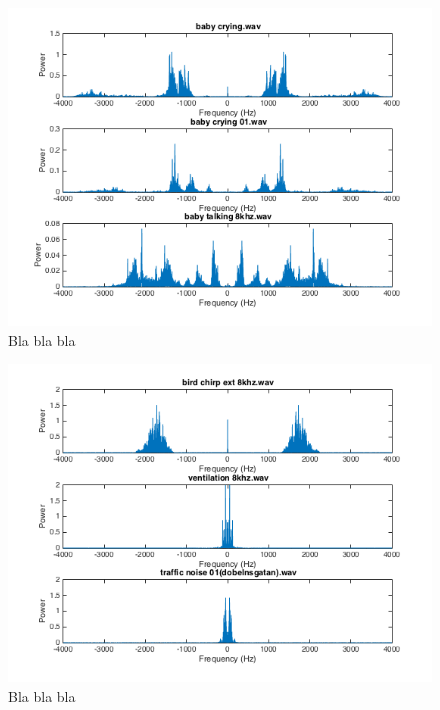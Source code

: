 \begin{figure}[h]
  \centering
  \includegraphics[width=1\textwidth]{sections/freq_spec_babyFix.png}
  \caption{Bla bla bla}
  \label{fig:enhanced}
\end{figure}


\begin{figure}
  \centering
  \includegraphics[width=1\textwidth]{sections/freq_spec_noise_linkaxis.png}
  \caption{Bla bla bla}
  \label{fig:noise_spec}
\end{figure}
